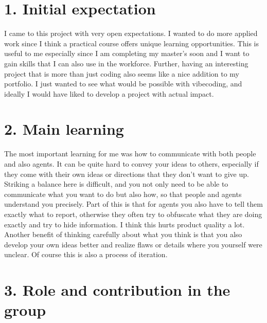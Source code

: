 \documentclass[11pt,a4paper]{article}
\begin{document}

\section*{1. Initial expectation}

I came to this project with very open expectations. I wanted to do more applied
work since I think a practical course offers unique learning opportunities. This
is useful to me especially since I am completing my master's soon and I want to
gain skills that I can also use in the workforce. Further, having an interesting
project that is more than just coding also seems like a nice addition to my
portfolio. I just wanted to see what would be possible with vibecoding, and
ideally I would have liked to develop a project with actual impact.

\section*{2. Main learning}

The most important learning for me was how to communicate with both people and
also agents. It can be quite hard to convey your ideas to others, especially if
they come with their own ideas or directions that they don't want to give up.
Striking a balance here is difficult, and you not only need to be able to
communicate what you want to do but also how, so that people and agents
understand you precisely. Part of this is that for agents you also have to tell
them exactly what to report, otherwise they often try to obfuscate what they are
doing exactly and try to hide information. I think this hurts product quality a
lot. Another benefit of thinking carefully about what you think is that you also
develop your own ideas better and realize flaws or details where you yourself
were unclear. Of course this is also a process of iteration.

\section*{3. Role and contribution in the group}
\end{document}
